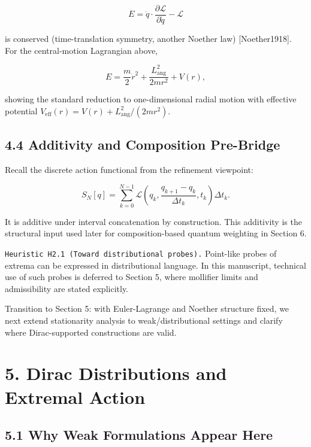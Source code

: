 \documentclass[
]{article}
\begin{document}
\[
E=\dot q\cdot\frac{\partial\mathcal L}{\partial\dot q}-\mathcal L
\]

is conserved (time-translation symmetry, another Noether law)
{[}Noether1918{]}. For the central-motion Lagrangian above,

\[
E=\frac{m}{2}\dot r^2+\frac{L_{\mathrm{ang}}^2}{2mr^2}+V(r),
\]

showing the standard reduction to one-dimensional radial motion with
effective potential
\(V_{\mathrm{eff}}(r)=V(r)+L_{\mathrm{ang}}^2/(2mr^2)\).

\hypertarget{additivity-and-composition-pre-bridge}{%
\subsection{4.4 Additivity and Composition
Pre-Bridge}\label{additivity-and-composition-pre-bridge}}

Recall the discrete action functional from the refinement viewpoint:

\[
S_N[q]=\sum_{k=0}^{N-1}
\mathcal L\!\left(q_k,\frac{q_{k+1}-q_k}{\Delta t_k},t_k\right)\Delta t_k.
\]

It is additive under interval concatenation by construction. This
additivity is the structural input used later for composition-based
quantum weighting in Section 6.

\texttt{Heuristic\ H2.1\ (Toward\ distributional\ probes).} Point-like
probes of extrema can be expressed in distributional language. In this
manuscript, technical use of such probes is deferred to Section 5, where
mollifier limits and admissibility are stated explicitly.

Transition to Section 5: with Euler-Lagrange and Noether structure
fixed, we next extend stationarity analysis to weak/distributional
settings and clarify where Dirac-supported constructions are valid.

\hypertarget{dirac-distributions-and-extremal-action}{%
\section{5. Dirac Distributions and Extremal
Action}\label{dirac-distributions-and-extremal-action}}

\hypertarget{why-weak-formulations-appear-here}{%
\subsection{5.1 Why Weak Formulations Appear
Here}\label{why-weak-formulations-appear-here}}
\end{document}
